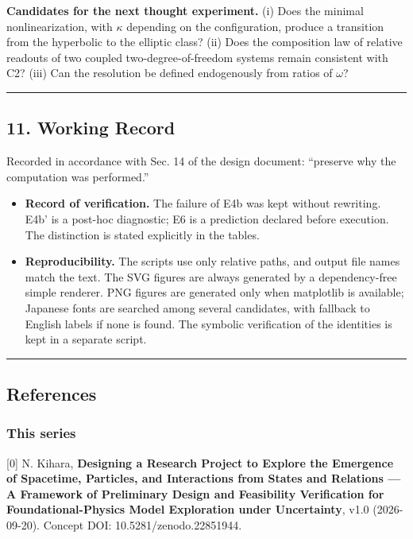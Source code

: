 \documentclass[
  a4paper,
]{article}
\newcounter{none} %
\providecommand{\tightlist}{%
  \setlength{\itemsep}{0pt}\setlength{\parskip}{0pt}}
\begin{document}
\textbf{Candidates for the next thought experiment.} (i) Does the
minimal nonlinearization, with \(\kappa\) depending on the
configuration, produce a transition from the hyperbolic to the elliptic
class? (ii) Does the composition law of relative readouts of two coupled
two-degree-of-freedom systems remain consistent with C2? (iii) Can the
resolution be defined endogenously from ratios of \(\omega\)?

\begin{center}\rule{0.5\linewidth}{0.5pt}\end{center}

\subsection{11. Working Record}\label{working-record}

Recorded in accordance with Sec. 14 of the design document: ``preserve
why the computation was performed.''

\begin{itemize}
\tightlist
\item
  \textbf{Record of verification.} The failure of E4b was kept without
  rewriting. E4b' is a post-hoc diagnostic; E6 is a prediction declared
  before execution. The distinction is stated explicitly in the tables.
\item
  \textbf{Reproducibility.} The scripts use only relative paths, and
  output file names match the text. The SVG figures are always generated
  by a dependency-free simple renderer. PNG figures are generated only
  when matplotlib is available; Japanese fonts are searched among
  several candidates, with fallback to English labels if none is found.
  The symbolic verification of the identities is kept in a separate
  script.
\end{itemize}

\begin{center}\rule{0.5\linewidth}{0.5pt}\end{center}

\subsection{References}\label{references}

\subsubsection{This series}\label{this-series}

{[}0{]} N. Kihara, \textbf{Designing a Research Project to Explore the
Emergence of Spacetime, Particles, and Interactions from States and
Relations --- A Framework of Preliminary Design and Feasibility
Verification for Foundational-Physics Model Exploration under
Uncertainty}, v1.0 (2026-09-20). Concept DOI: 10.5281/zenodo.22851944.
\end{document}
